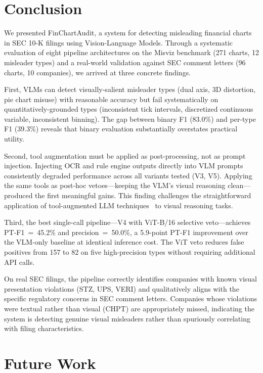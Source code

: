 \section{Conclusion}
\label{sec:conclusion}

We presented FinChartAudit, a system for detecting misleading financial charts in SEC 10-K filings using Vision-Language Models. Through a systematic evaluation of eight pipeline architectures on the Misviz benchmark (271 charts, 12 misleader types) and a real-world validation against SEC comment letters (96 charts, 10 companies), we arrived at three concrete findings.

First, VLMs can detect visually-salient misleader types (dual axis, 3D distortion, pie chart misuse) with reasonable accuracy but fail systematically on quantitatively-grounded types (inconsistent tick intervals, discretized continuous variable, inconsistent binning). The gap between binary F1 (83.0\%) and per-type F1 (39.3\%) reveals that binary evaluation substantially overstates practical utility.

Second, tool augmentation must be applied as post-processing, not as prompt injection. Injecting OCR and rule engine outputs directly into VLM prompts consistently degraded performance across all variants tested (V3, V5). Applying the same tools as post-hoc vetoes---keeping the VLM's visual reasoning clean---produced the first meaningful gains. This finding challenges the straightforward application of tool-augmented LLM techniques~\cite{yao2023react,schick2023toolformer} to visual reasoning tasks.

Third, the best single-call pipeline---V4 with ViT-B/16 selective veto---achieves PT-F1~=~45.2\% and precision~=~50.0\%, a 5.9-point PT-F1 improvement over the VLM-only baseline at identical inference cost. The ViT veto reduces false positives from 157 to 82 on five high-precision types without requiring additional API calls.

On real SEC filings, the pipeline correctly identifies companies with known visual presentation violations (STZ, UPS, VERI) and qualitatively aligns with the specific regulatory concerns in SEC comment letters. Companies whose violations were textual rather than visual (CHPT) are appropriately missed, indicating the system is detecting genuine visual misleaders rather than spuriously correlating with filing characteristics.

\section{Future Work}
\label{sec:future}

